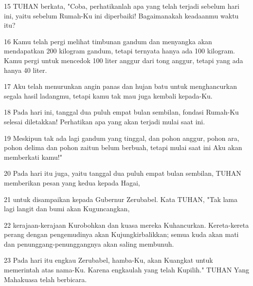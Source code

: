 \par 15 TUHAN berkata, "Coba, perhatikanlah apa yang telah terjadi sebelum hari ini, yaitu sebelum Rumah-Ku ini diperbaiki! Bagaimanakah keadaanmu waktu itu?
\par 16 Kamu telah pergi melihat timbunan gandum dan menyangka akan mendapatkan 200 kilogram gandum, tetapi ternyata hanya ada 100 kilogram. Kamu pergi untuk mencedok 100 liter anggur dari tong anggur, tetapi yang ada hanya 40 liter.
\par 17 Aku telah menurunkan angin panas dan hujan batu untuk menghancurkan segala hasil ladangmu, tetapi kamu tak mau juga kembali kepada-Ku.
\par 18 Pada hari ini, tanggal dua puluh empat bulan sembilan, fondasi Rumah-Ku selesai diletakkan! Perhatikan apa yang akan terjadi mulai saat ini.
\par 19 Meskipun tak ada lagi gandum yang tinggal, dan pohon anggur, pohon ara, pohon delima dan pohon zaitun belum berbuah, tetapi mulai saat ini Aku akan memberkati kamu!"
\par 20 Pada hari itu juga, yaitu tanggal dua puluh empat bulan sembilan, TUHAN memberikan pesan yang kedua kepada Hagai,
\par 21 untuk disampaikan kepada Gubernur Zerubabel. Kata TUHAN, "Tak lama lagi langit dan bumi akan Kuguncangkan,
\par 22 kerajaan-kerajaan Kurobohkan dan kuasa mereka Kuhancurkan. Kereta-kereta perang dengan pengemudinya akan Kujungkirbalikkan; semua kuda akan mati dan penunggang-penunggangnya akan saling membunuh.
\par 23 Pada hari itu engkau Zerubabel, hamba-Ku, akan Kuangkat untuk memerintah atas nama-Ku. Karena engkaulah yang telah Kupilih." TUHAN Yang Mahakuasa telah berbicara.


